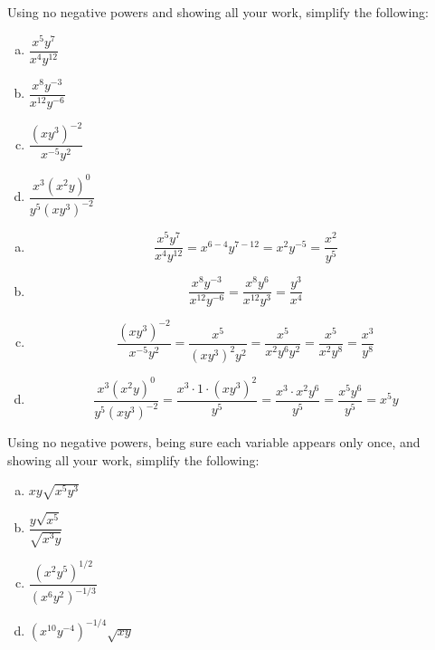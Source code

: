 \documentclass[11pt,letterpaper]{article}
\begin{document}
\newpage



 Using no negative powers and showing all your work, simplify the following:
        \begin{enumerate}[(a)]
        \item $\dfrac{x^5 y^7}{x^4 y^{12}}$
        \item $\dfrac{x^8 y^{-3}}{x^{12} y^{-6}}$
        \item $\dfrac{(xy^3)^{-2}}{x^{-5} y^2}$
        \item $\dfrac{x^3 (x^2y)^0}{y^5(xy^3)^{-2}}$
        \end{enumerate} \pspace

\sol
\begin{enumerate}[(a)]
\item 
	\[
	\dfrac{x^5 y^7}{x^4 y^{12}}= x^{6 - 4} y^{7 - 12}= x^2 y^{-5}= \dfrac{x^2}{y^5}
	\] \pspace

\item 
	\[
	\dfrac{x^8 y^{-3}}{x^{12} y^{-6}}= \dfrac{x^8 y^6}{x^{12} y^3}= \dfrac{y^3}{x^4}
	\] \pspace

\item 
	\[
	\dfrac{(xy^3)^{-2}}{x^{-5} y^2}= \dfrac{x^5}{(x y^3)^2 y^2}= \dfrac{x^5}{x^2 y^6 y^2}= \dfrac{x^5}{x^2 y^8}= \dfrac{x^3}{y^8}
	\] \pspace

\item 
	\[
	\dfrac{x^3 (x^2y)^0}{y^5(xy^3)^{-2}}= \dfrac{x^3 \cdot 1 \cdot (xy^3)^2}{y^5}= \dfrac{x^3 \cdot x^2 y^6}{y^5}= \dfrac{x^5 y^6}{y^5}= x^5y
	\]
\end{enumerate}



\newpage



 Using no negative powers, being sure each variable appears only once, and showing all your work, simplify the following:
        \begin{enumerate}[(a)]
        \item $xy\sqrt{x^5y^3}$
        \item $\dfrac{y \sqrt{x^5}}{\sqrt{x^3y}}$
        \item $\dfrac{(x^2 y^5)^{1/2}}{(x^6 y^{2})^{-1/3}}$
        \item $(x^{10} y^{-4})^{-1/4} \sqrt{xy}$
        \end{enumerate} \pspace
\end{document}
